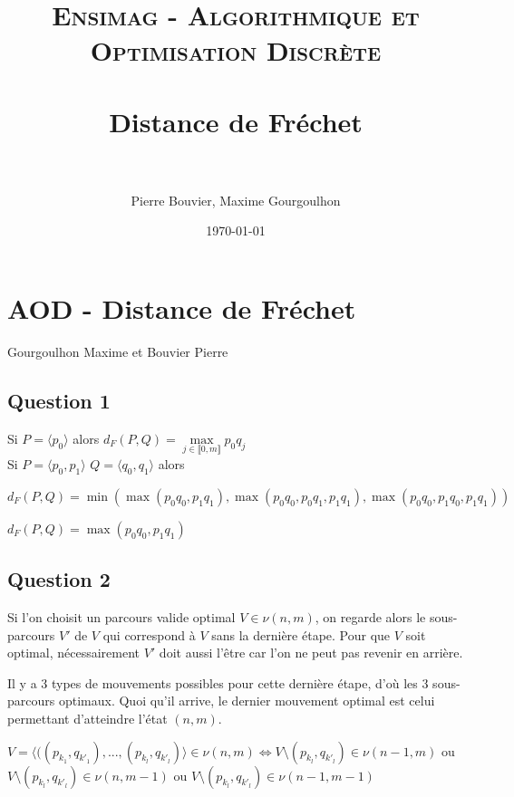 \documentclass[paper=a4, fontsize=11pt]{scrartcl} %
\title{	
\normalfont \normalsize 
\textsc{Ensimag - Algorithmique et Optimisation Discrète} \\ [25pt] %
\horrule{0.5pt} \\[0.4cm] %
\huge Distance de Fréchet \\ %
\horrule{2pt} \\[0.5cm] %
}
\author{Pierre Bouvier, Maxime Gourgoulhon} %
\date{\normalsize\today} %
\begin{document}


\section*{AOD - Distance de Fréchet}
Gourgoulhon Maxime et Bouvier Pierre


\subsection*{Question 1}

Si $P = \langle p_{0} \rangle $ alors $ d_F(P, Q) = \underset{j \in \llbracket 0, m\rrbracket}{\max} p_0 q_j$
\\

Si $P = \langle p_{0}, p_1 \rangle $ $Q = \langle q_0, q_1 \rangle $ alors

$d_F(P, Q) = \min (\max (p_0 q_0, p_1 q_1), \max (p_0 q_0, p_0 q_1, p_1 q_1), \max (p_0 q_0, p_1 q_0,p_1 q_1))$

$d_F(P, Q) = \max (p_0 q_0, p_1 q_1)$



\subsection*{Question 2}
Si l'on choisit un parcours valide optimal $V \in \nu(n, m)$, on regarde alors le sous-parcours $V'$ de $V$ qui correspond à $V$ sans la dernière étape. Pour que $V$ soit optimal, nécessairement $V'$ doit aussi l'être car l'on ne peut pas revenir en arrière.

Il y a 3 types de mouvements possibles pour cette dernière étape, d'où les 3 sous-parcours optimaux. Quoi qu'il arrive, le dernier mouvement optimal est celui permettant d'atteindre l'état $(n, m)$.

$V = \langle ((p_{k_1} , q_{k'_1}), ... , (p_{k_l} , q_{k'_l}) \rangle \in \nu(n, m) \Leftrightarrow V \setminus (p_{k_l} , q_{k'_l}) \in \nu(n-1, m)$ ou $ V \setminus (p_{k_l} , q_{k'_l}) \in \nu(n, m-1)$ ou $V \setminus (p_{k_l} , q_{k'_l}) \in \nu(n-1, m-1)$
\end{document}
